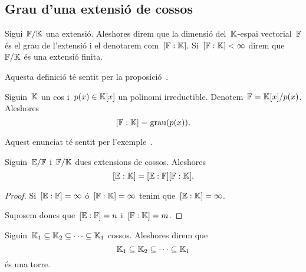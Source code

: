 \documentclass[../../main.tex]{subfiles}
\begin{document}
\subsection{Grau d'una extensió de cossos}
    \begin{definition}
        \label{def:grau d'una extensió}
        \label{def:extensió finita}
        Sigui~\(\mathbb{F}/\mathbb{K}\) una extensió.
        Aleshores direm que la dimensió del~\(\mathbb{K}\)-espai vectorial~\(\mathbb{F}\) és el {grau de l'extensió} i el denotarem com~\([\mathbb{F}:\mathbb{K}]\).
        Si~\([\mathbb{F}:\mathbb{K}]<\infty\) direm que~\(\mathbb{F}/\mathbb{K}\) és una extensió finita.

        Aquesta definició té sentit per la proposició~.
    \end{definition}
    \begin{example}
        \label{ex:el grau de l'extensió d'un cos i el quocient entre el seu anell de polinomis i un polinomi irreductible}
        Siguin~\(\mathbb{K}\) un cos i~\(p(x)\in\mathbb{K}[x]\) un polinomi irreductible.
        Denotem~\(\mathbb{F}=\mathbb{K}[x]/p(x)\).
        Aleshores
        \[
            [\mathbb{F}:\mathbb{K}]=\operatorname{grau}(p(x)).
        \]
    \end{example}
    \begin{solution}
        Aquest enunciat té sentit per l'exemple~.
    \end{solution}
    \begin{theorem}
        \label{thm:fórmula de les torres}
        Siguin~\(\mathbb{E}/\mathbb{F}\) i~\(\mathbb{F}/\mathbb{K}\) dues extensions de cossos.
        Aleshores
        \[
            [\mathbb{E}:\mathbb{K}]=[\mathbb{E}:\mathbb{F}][\mathbb{F}:\mathbb{K}].
        \]
    \end{theorem}
    \begin{proof}
        Si~\([\mathbb{E}:\mathbb{F}]=\infty\) ó~\([\mathbb{F}:\mathbb{K}]=\infty\) tenim que~\([\mathbb{E}:\mathbb{K}]=\infty\).

        Suposem doncs que~\([\mathbb{E}:\mathbb{F}]=n\) i~\([\mathbb{F}:\mathbb{K}]=m\).
    \end{proof}
    \begin{definition}[Torre]
        \label{def:torre de cossos}
        Siguin~\(\mathbb{K}_{1}\subseteq\mathbb{K}_{2}\subseteq\dots\subseteq\mathbb{K}_{1}\) cossos.
        Aleshores direm que
        \[
            \mathbb{K}_{1}\subseteq\mathbb{K}_{2}\subseteq\dots\subseteq\mathbb{K}_{1}
        \]
        és una torre.
    \end{definition}
\end{document}
